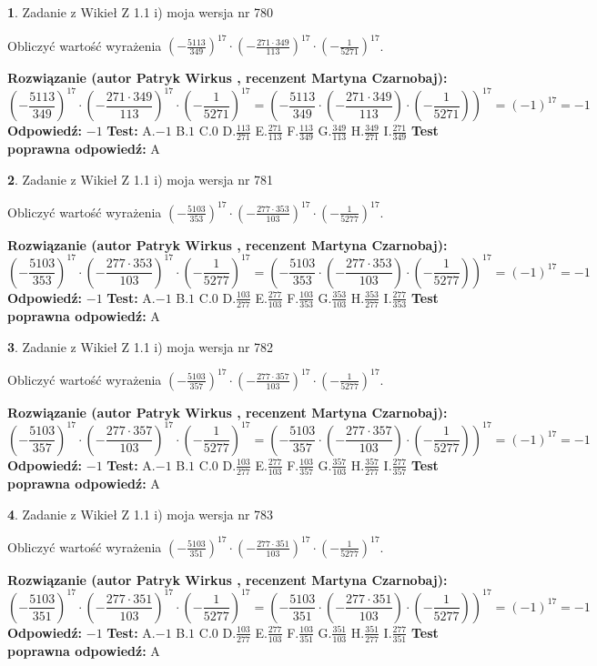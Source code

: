 \documentclass[12pt, a4paper]{article}
\theoremstyle{definition} %
\newtheorem{zad}{}
\newcommand{\zadStart}[1]{\begin{zad}#1\newline}
\newcommand{\zadStop}{\end{zad}}
\newcommand{\rozwStart}[2]{\noindent \textbf{Rozwiązanie (autor #1 , recenzent #2): }\newline}
\newcommand{\rozwStop}{\newline}
\newcommand{\odpStart}{\noindent \textbf{Odpowiedź:}\newline}
\newcommand{\odpStop}{\newline}
\newcommand{\testStart}{\noindent \textbf{Test:}\newline}
\newcommand{\testStop}{\newline}
\newcommand{\kluczStart}{\noindent \textbf{Test poprawna odpowiedź:}\newline}
\newcommand{\kluczStop}{\newline}
\begin{document}
\zadStart{Zadanie z Wikieł Z 1.1 i) moja wersja nr 780}

Obliczyć wartość wyrażenia $(-\frac{5113}{349})^{17} \cdot (-\frac{271 \cdot 349}{113})^{17} \cdot (-\frac{1}{5271})^{17}$.
\zadStop
\rozwStart{Patryk Wirkus}{Martyna Czarnobaj}
$$(-\frac{5113}{349})^{17} \cdot (-\frac{271 \cdot 349}{113})^{17} \cdot (-\frac{1}{5271})^{17} = (-\frac{5113}{349} \cdot (-\frac{271 \cdot 349}{113}) \cdot (-\frac{1}{5271}))^{17} = (-1)^{17} = -1$$
\rozwStop
\odpStart
$-1$
\odpStop
\testStart
A.$-1$ B.$1$ C.$0$ D.$\frac{113}{271}$ E.$\frac{271}{113}$
F.$\frac{113}{349}$ G.$\frac{349}{113}$
H.$\frac{349}{271}$
I.$\frac{271}{349}$
\testStop
\kluczStart
A
\kluczStop



\zadStart{Zadanie z Wikieł Z 1.1 i) moja wersja nr 781}

Obliczyć wartość wyrażenia $(-\frac{5103}{353})^{17} \cdot (-\frac{277 \cdot 353}{103})^{17} \cdot (-\frac{1}{5277})^{17}$.
\zadStop
\rozwStart{Patryk Wirkus}{Martyna Czarnobaj}
$$(-\frac{5103}{353})^{17} \cdot (-\frac{277 \cdot 353}{103})^{17} \cdot (-\frac{1}{5277})^{17} = (-\frac{5103}{353} \cdot (-\frac{277 \cdot 353}{103}) \cdot (-\frac{1}{5277}))^{17} = (-1)^{17} = -1$$
\rozwStop
\odpStart
$-1$
\odpStop
\testStart
A.$-1$ B.$1$ C.$0$ D.$\frac{103}{277}$ E.$\frac{277}{103}$
F.$\frac{103}{353}$ G.$\frac{353}{103}$
H.$\frac{353}{277}$
I.$\frac{277}{353}$
\testStop
\kluczStart
A
\kluczStop



\zadStart{Zadanie z Wikieł Z 1.1 i) moja wersja nr 782}

Obliczyć wartość wyrażenia $(-\frac{5103}{357})^{17} \cdot (-\frac{277 \cdot 357}{103})^{17} \cdot (-\frac{1}{5277})^{17}$.
\zadStop
\rozwStart{Patryk Wirkus}{Martyna Czarnobaj}
$$(-\frac{5103}{357})^{17} \cdot (-\frac{277 \cdot 357}{103})^{17} \cdot (-\frac{1}{5277})^{17} = (-\frac{5103}{357} \cdot (-\frac{277 \cdot 357}{103}) \cdot (-\frac{1}{5277}))^{17} = (-1)^{17} = -1$$
\rozwStop
\odpStart
$-1$
\odpStop
\testStart
A.$-1$ B.$1$ C.$0$ D.$\frac{103}{277}$ E.$\frac{277}{103}$
F.$\frac{103}{357}$ G.$\frac{357}{103}$
H.$\frac{357}{277}$
I.$\frac{277}{357}$
\testStop
\kluczStart
A
\kluczStop



\zadStart{Zadanie z Wikieł Z 1.1 i) moja wersja nr 783}

Obliczyć wartość wyrażenia $(-\frac{5103}{351})^{17} \cdot (-\frac{277 \cdot 351}{103})^{17} \cdot (-\frac{1}{5277})^{17}$.
\zadStop
\rozwStart{Patryk Wirkus}{Martyna Czarnobaj}
$$(-\frac{5103}{351})^{17} \cdot (-\frac{277 \cdot 351}{103})^{17} \cdot (-\frac{1}{5277})^{17} = (-\frac{5103}{351} \cdot (-\frac{277 \cdot 351}{103}) \cdot (-\frac{1}{5277}))^{17} = (-1)^{17} = -1$$
\rozwStop
\odpStart
$-1$
\odpStop
\testStart
A.$-1$ B.$1$ C.$0$ D.$\frac{103}{277}$ E.$\frac{277}{103}$
F.$\frac{103}{351}$ G.$\frac{351}{103}$
H.$\frac{351}{277}$
I.$\frac{277}{351}$
\testStop
\kluczStart
A
\kluczStop
\end{document}
